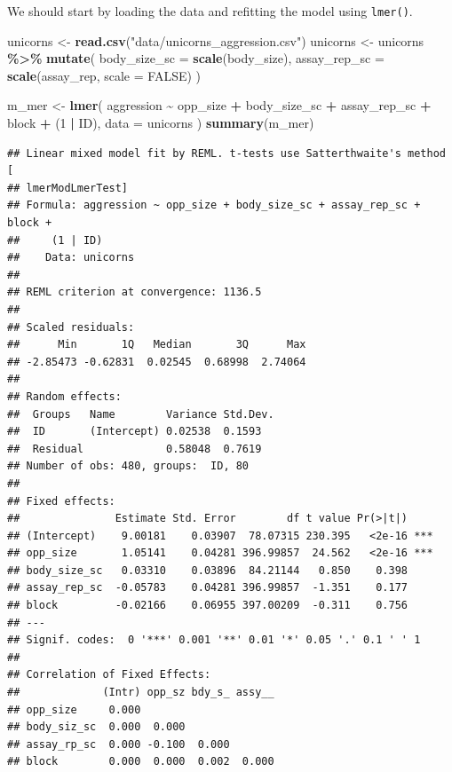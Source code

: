 \documentclass[
  12pt,
]{book}
\newenvironment{Shaded}{\begin{snugshade}}{\end{snugshade}}
\newcommand{\DataTypeTok}[1]{\textcolor[rgb]{0.13,0.29,0.53}{#1}}
\newcommand{\DecValTok}[1]{\textcolor[rgb]{0.00,0.00,0.81}{#1}}
\newcommand{\KeywordTok}[1]{\textcolor[rgb]{0.13,0.29,0.53}{\textbf{#1}}}
\newcommand{\NormalTok}[1]{#1}
\newcommand{\OperatorTok}[1]{\textcolor[rgb]{0.81,0.36,0.00}{\textbf{#1}}}
\newcommand{\OtherTok}[1]{\textcolor[rgb]{0.56,0.35,0.01}{#1}}
\newcommand{\StringTok}[1]{\textcolor[rgb]{0.31,0.60,0.02}{#1}}
\begin{document}
We should start by loading the data and refitting the model using \texttt{lmer()}.

\begin{Shaded}
\begin{Highlighting}[]
\NormalTok{unicorns \textless{}{-}}\StringTok{ }\KeywordTok{read.csv}\NormalTok{(}\StringTok{"data/unicorns\_aggression.csv"}\NormalTok{)}
\NormalTok{unicorns \textless{}{-}}\StringTok{ }\NormalTok{unicorns }\OperatorTok{\%\textgreater{}\%}
\StringTok{  }\KeywordTok{mutate}\NormalTok{(}
    \DataTypeTok{body\_size\_sc =} \KeywordTok{scale}\NormalTok{(body\_size),}
    \DataTypeTok{assay\_rep\_sc =} \KeywordTok{scale}\NormalTok{(assay\_rep, }\DataTypeTok{scale =} \OtherTok{FALSE}\NormalTok{)}
\NormalTok{  )}

\NormalTok{m\_mer \textless{}{-}}\StringTok{ }\KeywordTok{lmer}\NormalTok{(}
\NormalTok{    aggression }\OperatorTok{\textasciitilde{}}\StringTok{ }\NormalTok{opp\_size }\OperatorTok{+}\StringTok{ }\NormalTok{body\_size\_sc }\OperatorTok{+}\StringTok{ }\NormalTok{assay\_rep\_sc }\OperatorTok{+}\StringTok{ }\NormalTok{block}
      \OperatorTok{+}\StringTok{ }\NormalTok{(}\DecValTok{1} \OperatorTok{|}\StringTok{ }\NormalTok{ID),}
    \DataTypeTok{data =}\NormalTok{ unicorns}
\NormalTok{)}
\KeywordTok{summary}\NormalTok{(m\_mer)}
\end{Highlighting}
\end{Shaded}

\begin{verbatim}
## Linear mixed model fit by REML. t-tests use Satterthwaite's method [
## lmerModLmerTest]
## Formula: aggression ~ opp_size + body_size_sc + assay_rep_sc + block +  
##     (1 | ID)
##    Data: unicorns
## 
## REML criterion at convergence: 1136.5
## 
## Scaled residuals: 
##      Min       1Q   Median       3Q      Max 
## -2.85473 -0.62831  0.02545  0.68998  2.74064 
## 
## Random effects:
##  Groups   Name        Variance Std.Dev.
##  ID       (Intercept) 0.02538  0.1593  
##  Residual             0.58048  0.7619  
## Number of obs: 480, groups:  ID, 80
## 
## Fixed effects:
##               Estimate Std. Error        df t value Pr(>|t|)    
## (Intercept)    9.00181    0.03907  78.07315 230.395   <2e-16 ***
## opp_size       1.05141    0.04281 396.99857  24.562   <2e-16 ***
## body_size_sc   0.03310    0.03896  84.21144   0.850    0.398    
## assay_rep_sc  -0.05783    0.04281 396.99857  -1.351    0.177    
## block         -0.02166    0.06955 397.00209  -0.311    0.756    
## ---
## Signif. codes:  0 '***' 0.001 '**' 0.01 '*' 0.05 '.' 0.1 ' ' 1
## 
## Correlation of Fixed Effects:
##             (Intr) opp_sz bdy_s_ assy__
## opp_size     0.000                     
## body_siz_sc  0.000  0.000              
## assay_rp_sc  0.000 -0.100  0.000       
## block        0.000  0.000  0.002  0.000
\end{verbatim}
\end{document}
